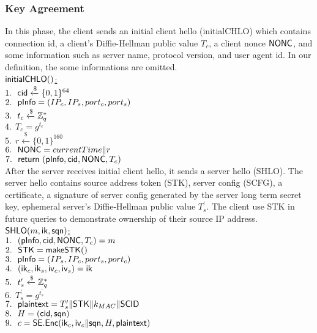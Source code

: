 \subsubsection{Key Agreement}
In this phase, the client sends an initial client
hello (initialCHLO) which contains connection id,
a client's Diffie-Hellman public value $T_c$, a client
nonce $\mathsf{NONC}$, and some information such as server name,
protocol version, and user agent id. In our definition,
the some informations are omitted.
\\
\noindent
\underline{$\mathsf{initialCHLO}()$:} \\
 $1.\ \ \mathsf{cid} \xleftarrow{\$} \{0,1\}^{64} $ \\
 $2.\ \ \mathsf{pInfo} = (IP_c, IP_s, port_c, port_s)$ \\
 $3.\ \ t_c \xleftarrow{\$} \mathbb{Z}_{q}^{\ast}$ \\
 $4.\ \ T_c = g^{t_c}$ \\
 $5.\ \ r \xleftarrow{\$} \{0,1\}^{160}$ \\
 $6.\ \ \mathsf{NONC} = currentTime \| r$ \\
 $7.\ \ \mathsf{return}\ (\mathsf{pInfo}, \mathsf{cid}, \mathsf{NONC}, T_c)$ \\
%
After the server receives initial client hello, it
sends a server hello (SHLO). The server hello contains
source address token (STK), server config (SCFG),
a certificate, a signature of server config generated
by the server long term secret key, ephemeral server's
Diffie-Hellman public value $T_s^{\prime}$. The client use
STK in future queries to demonstrate ownership of their
source IP address.
\\
\noindent
\underline{$\mathsf{SHLO}(m, \mathsf{ik}, \mathsf{sqn})$:} \\
 $1.\ \ (\mathsf{pInfo}, \mathsf{cid}, \mathsf{NONC}, T_c) = m$ \\
 $2.\ \ \mathsf{STK} = \mathsf{makeSTK}()$ \\
 $3.\ \ \mathsf{pInfo} = (IP_s, IP_c, port_s, port_c)$ \\
 $4.\ \ (\mathsf{ik}_c, \mathsf{ik}_s, \mathsf{iv}_c, \mathsf{iv}_s) = \mathsf{ik}$ \\
 $5.\ \ t_s^{\prime} \xleftarrow{\$} \mathbb{Z}_{q}^{\ast}$ \\
 $6.\ \ T_s^{\prime} = g^{t_s^{\prime}}$ \\
 $7.\ \ \mathsf{plaintext} = T_{s}^{\prime} \| \mathsf{STK} \| k_{MAC} \| \mathsf{SCID}$\\
 $8.\ \ H = (\mathsf{cid}, \mathsf{sqn})$ \\
 $9.\ \ c = \mathsf{SE}.\mathsf{Enc}(\mathsf{ik}_c, \mathsf{iv}_c \| \mathsf{sqn}, H, \mathsf{plaintext})$ \\
